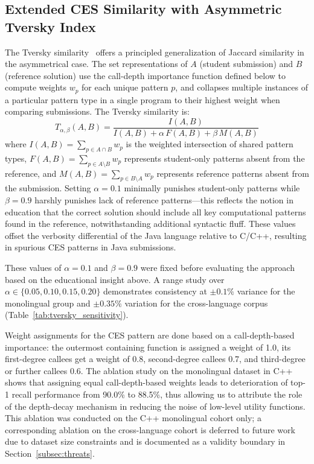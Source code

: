 \subsection{Extended CES Similarity with Asymmetric Tversky Index}
\label{subsec:tversky}

The Tversky similarity~\cite{ref_tversky1977} offers a principled generalization of Jaccard similarity in the asymmetrical case. The set representations of $A$ (student submission) and $B$ (reference solution) use the call-depth importance function defined below to compute weights $w_{p}$ for each unique pattern $p$, and collapses multiple instances of a particular pattern type in a single program to their highest weight when comparing submissions. The Tversky similarity is:
\begin{equation}
    T_{\alpha,\beta}(A,B) = \frac{I(A,B)}{I(A,B) + \alpha\,F(A,B) + \beta\,M(A,B)}
\end{equation}
where $I(A,B) = \sum_{p \in A \cap B} w_p$ is the weighted intersection of shared pattern types, $F(A,B) = \sum_{p \in A \setminus B} w_p$ represents student-only patterns absent from the reference, and $M(A,B) = \sum_{p \in B \setminus A} w_p$ represents reference patterns absent from the submission. Setting $\alpha{=}0.1$ minimally punishes student-only patterns while $\beta{=}0.9$ harshly punishes lack of reference patterns---this reflects the notion in education that the correct solution should include all key computational patterns found in the reference, notwithstanding additional syntactic fluff. These values offset the verbosity differential of the Java language relative to C/C++, resulting in spurious CES patterns in Java submissions.

These values of $\alpha{=}0.1$ and $\beta{=}0.9$ were fixed before evaluating the approach based on the educational insight above. A range study over $\alpha \in \{0.05, 0.10, 0.15, 0.20\}$ demonstrates consistency at $\pm0.1\%$ variance for the monolingual group and $\pm0.35\%$ variation for the cross-language corpus (Table~\ref{tab:tversky_sensitivity}).

Weight assignments for the CES pattern are done based on a call-depth-based importance: the outermost containing function is assigned a weight of 1.0, its first-degree callees get a weight of 0.8, second-degree callees 0.7, and third-degree or further callees 0.6. The ablation study on the monolingual dataset in C++ shows that assigning equal call-depth-based weights leads to deterioration of top-1 recall performance from 90.0\% to 88.5\%, thus allowing us to attribute the role of the depth-decay mechanism in reducing the noise of low-level utility functions. This ablation was conducted on the C++ monolingual cohort only; a corresponding ablation on the cross-language cohort is deferred to future work due to dataset size constraints and is documented as a validity boundary in Section~\ref{subsec:threats}.

